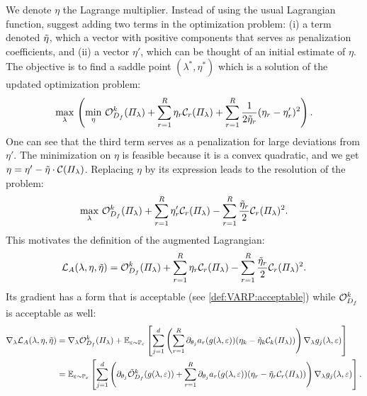     We denote $\eta$ the Lagrange multiplier. Instead of using the usual Lagrangian function, \citet{nocedal_numerical_2006} suggest adding two terms in the optimization problem: (i) a term denoted $\Tilde{\eta}$, which a vector with positive components that serves as penalization coefficients, and (ii) a vector $\eta'$, which can be thought of an initial  estimate of $\eta$.
    The objective is to find a saddle point $(\lambda^*, \eta^*)$ which is a solution of the updated optimization problem:
    \begin{equation}
        \max_{\lambda} \, \left(\min_{\eta} \,  \mathcal{O}^k_{D_f}(\varPi_{\lambda}) + \sum_{r=1}^R \eta_r \mathcal{C}_r(\varPi_{\lambda})  + \sum_{r=1}^R \frac{1}{2\Tilde{\eta}_r} ( \eta_r - \eta_r')^2 \right)   .
    \end{equation}
     One can see that the third term serves as a penalization for large deviations from $\eta'$. The minimization on $\eta$ is feasible because it is a convex quadratic, and we get $\eta = \eta' - \Tilde{\eta} \cdot \mathcal{C}(\varPi_\lambda)$. Replacing $\eta$ by its expression leads to the resolution of the problem:
     \begin{equation}
        \max_{\lambda} \, \mathcal{O}^k_{D_f}(\varPi_{\lambda}) + \sum_{r=1}^R \eta_r' \mathcal{C}_r(\varPi_{\lambda}) - \sum_{r=1}^R \frac{\Tilde{\eta}_r}{2} \mathcal{C}_r(\varPi_{\lambda})^2 .
     \end{equation} 
    This motivates the definition of the augmented Lagrangian:
    \begin{equation}
        \mathcal{L}_A(\lambda, \eta, \Tilde{\eta}) = \mathcal{O}^k_{D_f}(\varPi_{\lambda}) + \sum_{r=1}^R \eta_r \mathcal{C}_r(\varPi_{\lambda}) - \sum_{r=1}^R \frac{\Tilde{\eta}_r}{2} \mathcal{C}_r(\varPi_{\lambda})^2 .
    \end{equation}
    Its gradient has a form that  is acceptable (see \cref{def:VARP:acceptable}) while $\mathcal{O}_{D_f}^k$ is acceptable as well: 
    \begin{equation}
    \begin{aligned}
     \nabla_\lambda \mathcal{L}_A(\lambda, \eta, \Tilde{\eta}) &= \nabla_\lambda \mathcal{O}^k_{D_f}(\varPi_{\lambda}) +  \mathbb{E}_{\varepsilon\sim\mathbb{P}_\varepsilon}\left[ \sum_{j=1}^d \left(\sum_{r=1}^R  \partial_{\theta_j} a_r(g(\lambda, \varepsilon))(\eta_k - \Tilde{\eta}_k\mathcal{C}_k(\varPi_{\lambda}))\right)\nabla_\lambda g_j(\lambda,\varepsilon)\right] \\
    &= \mathbb{E}_{\varepsilon\sim\mathbb{P}_\varepsilon}\left[ \sum_{j=1}^d \left( \partial_{\theta_j} \Tilde{\mathcal{O}}^k_{D_f} (g(\lambda,\varepsilon))  + \sum_{r=1}^R  \partial_{\theta_j} a_r(g(\lambda, \varepsilon))(\eta_r - \Tilde{\eta}_r\mathcal{C}_r(\varPi_{\lambda}))\right)\nabla_\lambda g_j(\lambda,\varepsilon)  \right] .
    \end{aligned}
\end{equation}
